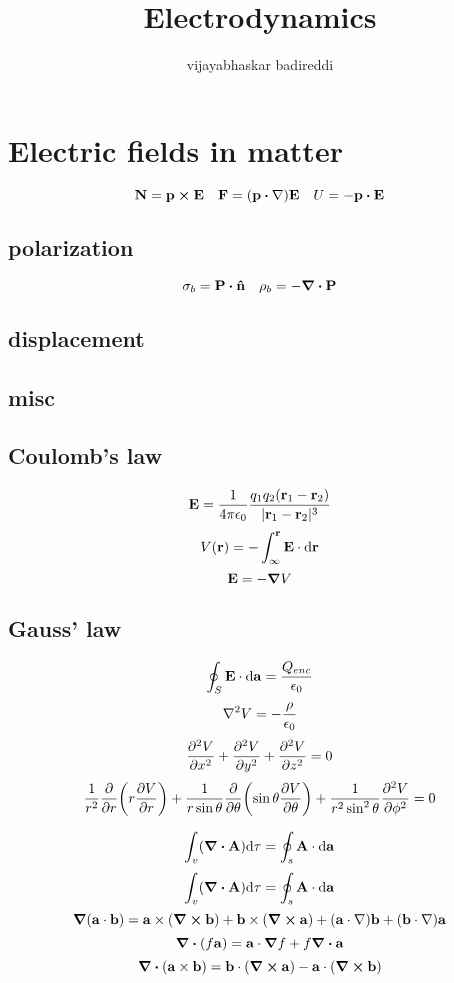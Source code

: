 \documentclass[12pt]{article}
\title{Electrodynamics}
\author{vijayabhaskar badireddi}
\begin{document}





\section{Electric fields in matter}
\[\vb{N}=\vb{p}\cp\vb{E}\quad\vb{F}=\qty(\vb{p}\vdot\nabla)\vb{E}\quad U=-\vb{p}\vdot\vb{E}\]
\subsection*{polarization}
\[\sigma_b=\vb{P}\vdot\vu{n}\quad\rho_b=-\div{\vb{P}}\]
\subsection*{displacement}
\subsection*{misc}

\subsection*{Coulomb's law}
\[\vb{E}=\frac{1}{4\pi\epsilon_0}\frac{q_1q_2(\vb{r}_1-\vb{r}_2)}{|\vb{r}_1-\vb{r}_2|^3}\]
\[V(\vb{r})=-\int_\infty^{\vb{r}}\vb{E}\cdot\dd\vb{r}\]
\[\vb{E}=-\grad{V}\]

\subsection*{Gauss' law}
\[\oint_S{\vb{E}\cdot\dd{\vb{a}}}=\frac{Q_{enc}}{\epsilon_0}\]
\[\laplacian{V}=-\frac{\rho}{\epsilon_0}\]
\[\pdv[2]{V}{x}+\pdv[2]{V}{y}+\pdv[2]{V}{z}=0\]
\[\frac{1}{r^2}\pdv{r}\qty(r\pdv{V}{r})+\frac{1}{r\sin\theta}\pdv{\theta}\qty(\sin\theta\pdv{V}{\theta})+\frac{1}{r^2\sin^2\theta}\pdv[2]{V}{\phi}=0\]

\[\int_{v}(\div{\vb{A}})\dd\tau=\oint_{s}\vb{A}\cdot\dd{\vb{a}}\]
\[\int_{v}(\div{\vb{A}})\dd\tau=\oint_{s}\vb{A}\cdot\dd{\vb{a}}\]
\[\grad{(\vb{a}\cdot\vb{b})}=\vb{a}\times(\curl{\vb{b}})+\vb{b}\times(\curl{\vb{a}})+(\vb{a}\cdot\nabla)\vb{b}+(\vb{b}\cdot\nabla)\vb{a}\]
\[\div{(f\vb{a})}=\vb{a}\cdot\grad{f}+f\div{\vb{a}}\]
\[\div{(\vb{a}\times\vb{b})}=\vb{b}\cdot(\curl{\vb{a}})-\vb{a}\cdot(\curl{\vb{b}})\]
\end{document}
